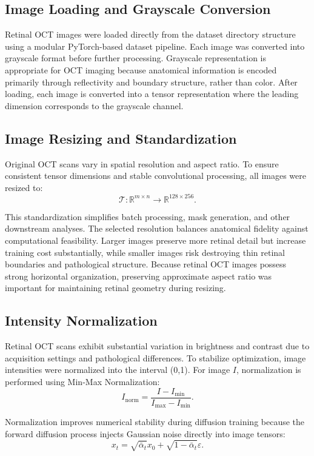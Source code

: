 \documentclass[12pt,oneside]{article}
\newcommand{\R}{\mathbb{R}}
\begin{document}
\subsection*{Image Loading and Grayscale Conversion}

Retinal OCT images were loaded directly from the dataset directory structure using a modular PyTorch-based dataset pipeline. Each image was converted into grayscale format before further processing.
Grayscale representation is appropriate for OCT imaging because anatomical information is encoded primarily through reflectivity and boundary structure, rather than color.
After loading, each image is converted into a tensor representation where the leading dimension corresponds to the grayscale channel.

\subsection*{Image Resizing and Standardization}

Original OCT scans vary in spatial resolution and aspect ratio. To ensure consistent tensor dimensions and stable convolutional processing, all images were resized to:
\[
\mathcal{T}:
\R^{m \times n}
\to
\R^{128 \times 256}.
\]

This standardization simplifies batch processing, mask generation, and other downstream analyses.
The selected resolution balances anatomical fidelity against computational feasibility. Larger images preserve more retinal detail but increase training cost substantially, while smaller images risk destroying thin retinal boundaries and pathological structure.
Because retinal OCT images possess strong horizontal organization, preserving approximate aspect ratio was important for maintaining retinal geometry during resizing.

\subsection*{Intensity Normalization}

Retinal OCT scans exhibit substantial variation in brightness and contrast due to acquisition settings and pathological differences. To stabilize optimization, image intensities were normalized into the interval (0,1).
For image $I$, normalization is performed using Min-Max Normalization:
\[
I_{\mathrm{norm}}
=
\frac{
I-I_{\min}
}{
I_{\max}-I_{\min}
}.
\]

Normalization improves numerical stability during diffusion training because the forward diffusion process injects Gaussian noise directly into image tensors:
\[
x_t
=
\sqrt{\bar{\alpha}_t}x_0
+
\sqrt{1-\bar{\alpha}_t}\varepsilon.
\]
\end{document}
